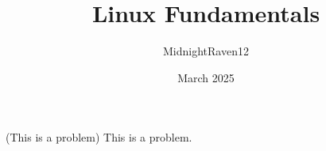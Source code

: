 \documentclass[mdthm]{scrartcl}
\title{Linux Fundamentals}
\author{MidnightRaven12}
\date{March 2025}
\begin{document}
    \maketitle
    \tableofcontents
    \begin{problem*} (This is a problem)
      This is a problem.
    \end{problem*}

    \href{}{}
\end{document}
